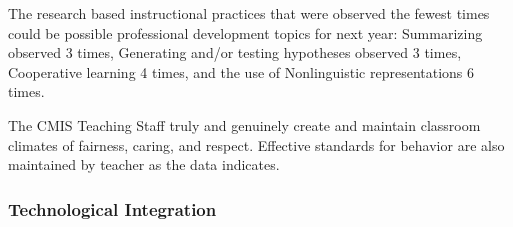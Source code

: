 \begin{findings}

The research based instructional practices that were observed the fewest times could be possible professional development topics for next year: 
Summarizing observed 3 times, Generating and/or testing hypotheses observed 3 times, Cooperative learning 4 times, and the use of  Nonlinguistic representations 6 times. 


The CMIS Teaching Staff truly and genuinely create and maintain classroom climates of fairness, caring, and respect. Effective standards for behavior are also maintained by teacher as the data indicates. 
\end{findings}

\subsubsection{Technological Integration}



